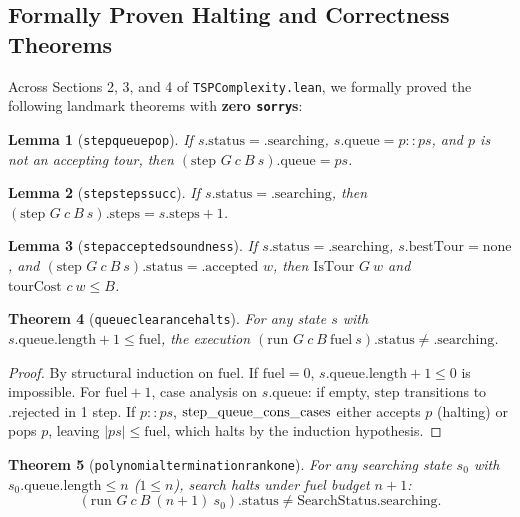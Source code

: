\documentclass[11pt,a4paper]{article}
\renewcommand{\_}{\origunderscore\allowbreak}
\theoremstyle{plain}
\newtheorem{theorem}{Theorem}[section]
\newtheorem{lemma}[theorem]{Lemma}
\theoremstyle{definition}
\theoremstyle{remark}
\begin{document}
\subsection{Formally Proven Halting and Correctness Theorems}
Across Sections 2, 3, and 4 of \texttt{TSP\allowbreak Complexity.\allowbreak lean}, we formally proved the following landmark theorems with \textbf{zero \texttt{sorry}s}:

\begin{lemma}[\texttt{step\_queue\_pop}]
If $s.\text{status} = \text{.searching}$, $s.\text{queue} = p :: ps$, and $p$ is not an accepting tour, then $(\text{step } G\ c\ B\ s).\text{queue} = ps$.
\end{lemma}

\begin{lemma}[\texttt{step\_steps\_succ}]
If $s.\text{status} = \text{.searching}$, then $(\text{step } G\ c\ B\ s).\text{steps} = s.\text{steps} + 1$.
\end{lemma}

\begin{lemma}[\texttt{step\_accepted\_soundness}]
If $s.\text{status} = \text{.searching}$, $s.\text{bestTour} = \text{none}$, and $(\text{step } G\ c\ B\ s).\text{status} = \text{.accepted } w$, then $\text{IsTour } G\ w$ and $\text{tourCost } c\ w \le B$.
\end{lemma}

\begin{theorem}[\texttt{queue\_clearance\_halts}]
For any state $s$ with $s.\text{queue}.\text{length} + 1 \le \text{fuel}$, the execution $(\text{run } G\ c\ B\ \text{fuel}\ s).\text{status} \ne \text{.searching}$.
\end{theorem}
\begin{proof}
By structural induction on $\text{fuel}$. If $\text{fuel} = 0$, $s.\text{queue}.\text{length} + 1 \le 0$ is impossible. For $\text{fuel} + 1$, case analysis on $s.\text{queue}$: if empty, $\text{step}$ transitions to $\text{.rejected}$ in 1 step. If $p :: ps$, $\text{step\_queue\_cons\_cases}$ either accepts $p$ (halting) or pops $p$, leaving $|ps| \le \text{fuel}$, which halts by the induction hypothesis.
\end{proof}

\begin{theorem}[\texttt{polynomial\_termination\_rank\_one}]
For any searching state $s_0$ with $s_0.\text{queue}.\allowbreak\text{length} \le n$ ($1 \le n$), search halts under fuel budget $n + 1$:
\begin{equation*}
  (\text{run } G\ c\ B\ (n + 1)\ s_0).\text{status} \ne \text{SearchStatus.searching}.
\end{equation*}
\end{theorem}
\end{document}
